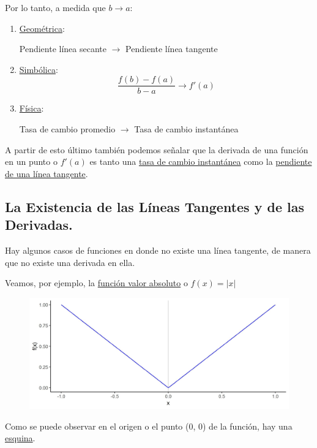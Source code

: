 \documentclass[12pt]{article}
\begin{document}
Por lo tanto, a medida que $b \to a$:

\begin{enumerate}
\item \underline{Geométrica}: 

\centerline{Pendiente línea secante $\to$ Pendiente línea tangente}

\item \underline{Simbólica}:
\[\frac{f(b)-f(a)}{b-a} \to f'(a)\]

\item \underline{Física}: 

\centerline{Tasa de cambio promedio $\to$ Tasa de cambio instantánea}

\end{enumerate}

A partir de esto último también podemos señalar que la derivada de una función en un punto o \underline{$f'(a)$} es tanto una \underline{tasa de cambio instantánea} como la \underline{pendiente de una línea tangente}.



\subsection{La Existencia de las Líneas Tangentes y de las Derivadas.}

Hay algunos casos de funciones en donde no existe una línea tangente, de manera que no existe una derivada en ella.

Veamos, por ejemplo, la \underline{función valor absoluto} o $f(x) = |x|$

\newpage

\begin{figure}[hbt!]
\centering
\includegraphics[scale=0.7]{img/abs_fun_plot.jpg}
\end{figure}

Como se puede observar en el origen o el punto (0, 0) de la función, hay una \underline{esquina}.
\end{document}
